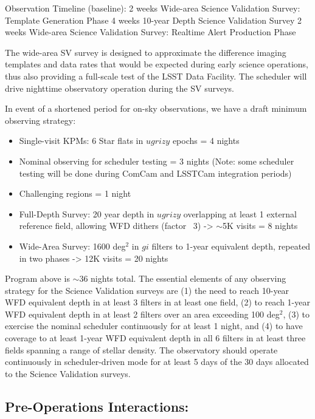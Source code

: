Observation Timeline (baseline):
2 weeks	Wide-area Science Validation Survey: Template Generation Phase
4 weeks	10-year Depth Science Validation Survey
2 weeks	Wide-area Science Validation Survey: Realtime Alert Production Phase

The wide-area SV survey is designed to approximate the difference imaging templates and data rates that would be expected during early science operations, thus also providing a full-scale test of the LSST Data Facility. The scheduler will drive nighttime observatory operation during the SV surveys.

In event of a shortened period for on-sky observations, we have a draft minimum observing strategy:

\begin{itemize}
\item Single-visit KPMs:
        6 Star flats in $ugrizy$  epochs = 4 nights
\item Nominal observing for scheduler testing = 3 nights (Note: some scheduler testing will be done during ComCam and LSSTCam integration periods)
\item Challenging regions = 1 night
\item Full-Depth Survey: 
        20 year depth in $ugrizy$ overlapping at least 1 external reference field, allowing WFD dithers (factor ~3) -> $\sim$5K visits = 8 nights
\item Wide-Area Survey:
        1600 deg$^2$ in $gi$ filters to 1-year equivalent depth, repeated in two phases -> 12K visits = 20 nights
\end{itemize}

Program above is $\sim36$ nights total. The essential elements of any observing strategy for the Science Validation surveys are (1) the need to reach 10-year WFD equivalent depth in at least 3 filters in at least one field, (2) to reach 1-year WFD equivalent depth in at least 2 filters over an area exceeding 100 deg$^2$, (3) to exercise the nominal scheduler continuously for at least 1 night, and (4) to have coverage to at least 1-year WFD equivalent depth in all 6 filters in at least three fields spanning a range of stellar density. The observatory should operate continuously in scheduler-driven mode for at least 5 days of the 30 days allocated to the Science Validation surveys.

\subsection{Pre-Operations Interactions:}


